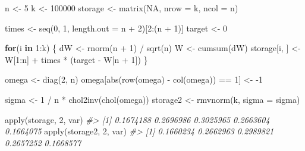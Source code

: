 \documentclass[
]{article}
\newenvironment{Shaded}{\begin{snugshade}}{\end{snugshade}}
\newcommand{\AttributeTok}[1]{\textcolor[rgb]{0.77,0.63,0.00}{#1}}
\newcommand{\CommentTok}[1]{\textcolor[rgb]{0.56,0.35,0.01}{\textit{#1}}}
\newcommand{\ConstantTok}[1]{\textcolor[rgb]{0.00,0.00,0.00}{#1}}
\newcommand{\ControlFlowTok}[1]{\textcolor[rgb]{0.13,0.29,0.53}{\textbf{#1}}}
\newcommand{\DecValTok}[1]{\textcolor[rgb]{0.00,0.00,0.81}{#1}}
\newcommand{\FunctionTok}[1]{\textcolor[rgb]{0.00,0.00,0.00}{#1}}
\newcommand{\NormalTok}[1]{#1}
\newcommand{\OtherTok}[1]{\textcolor[rgb]{0.56,0.35,0.01}{#1}}
\newcommand{\SpecialCharTok}[1]{\textcolor[rgb]{0.00,0.00,0.00}{#1}}
\begin{document}
\begin{Shaded}
\begin{Highlighting}[]
\NormalTok{n }\OtherTok{\textless{}{-}} \DecValTok{5}
\NormalTok{k }\OtherTok{\textless{}{-}} \DecValTok{100000}
\NormalTok{storage }\OtherTok{\textless{}{-}} \FunctionTok{matrix}\NormalTok{(}\ConstantTok{NA}\NormalTok{, }\AttributeTok{nrow =}\NormalTok{ k, }\AttributeTok{ncol =}\NormalTok{ n)}

\NormalTok{times }\OtherTok{\textless{}{-}} \FunctionTok{seq}\NormalTok{(}\DecValTok{0}\NormalTok{, }\DecValTok{1}\NormalTok{, }\AttributeTok{length.out =}\NormalTok{ n }\SpecialCharTok{+} \DecValTok{2}\NormalTok{)[}\DecValTok{2}\SpecialCharTok{:}\NormalTok{(n }\SpecialCharTok{+} \DecValTok{1}\NormalTok{)]}
\NormalTok{target }\OtherTok{\textless{}{-}} \DecValTok{0}

\ControlFlowTok{for}\NormalTok{(i }\ControlFlowTok{in} \DecValTok{1}\SpecialCharTok{:}\NormalTok{k) \{}
\NormalTok{  dW }\OtherTok{\textless{}{-}} \FunctionTok{rnorm}\NormalTok{(n }\SpecialCharTok{+} \DecValTok{1}\NormalTok{) }\SpecialCharTok{/} \FunctionTok{sqrt}\NormalTok{(n)}
\NormalTok{  W }\OtherTok{\textless{}{-}} \FunctionTok{cumsum}\NormalTok{(dW)}
\NormalTok{  storage[i, ] }\OtherTok{\textless{}{-}}\NormalTok{ W[}\DecValTok{1}\SpecialCharTok{:}\NormalTok{n] }\SpecialCharTok{+}\NormalTok{ times }\SpecialCharTok{*}\NormalTok{ (target }\SpecialCharTok{{-}}\NormalTok{ W[n }\SpecialCharTok{+} \DecValTok{1}\NormalTok{])}
\NormalTok{\}}

\NormalTok{omega }\OtherTok{\textless{}{-}} \FunctionTok{diag}\NormalTok{(}\DecValTok{2}\NormalTok{, n)}
\NormalTok{omega[}\FunctionTok{abs}\NormalTok{(}\FunctionTok{row}\NormalTok{(omega) }\SpecialCharTok{{-}} \FunctionTok{col}\NormalTok{(omega)) }\SpecialCharTok{==} \DecValTok{1}\NormalTok{] }\OtherTok{\textless{}{-}} \SpecialCharTok{{-}}\DecValTok{1}

\NormalTok{sigma }\OtherTok{\textless{}{-}} \DecValTok{1} \SpecialCharTok{/}\NormalTok{ n }\SpecialCharTok{*} \FunctionTok{chol2inv}\NormalTok{(}\FunctionTok{chol}\NormalTok{(omega))}
\NormalTok{storage2 }\OtherTok{\textless{}{-}} \FunctionTok{rmvnorm}\NormalTok{(k, }\AttributeTok{sigma =}\NormalTok{ sigma)}

\FunctionTok{apply}\NormalTok{(storage, }\DecValTok{2}\NormalTok{, var)}
\CommentTok{\#\textgreater{} [1] 0.1674188 0.2696986 0.3025965 0.2663604 0.1664075}
\FunctionTok{apply}\NormalTok{(storage2, }\DecValTok{2}\NormalTok{, var)}
\CommentTok{\#\textgreater{} [1] 0.1660234 0.2662963 0.2989821 0.2657252 0.1668577}
\end{Highlighting}
\end{Shaded}
\end{document}
